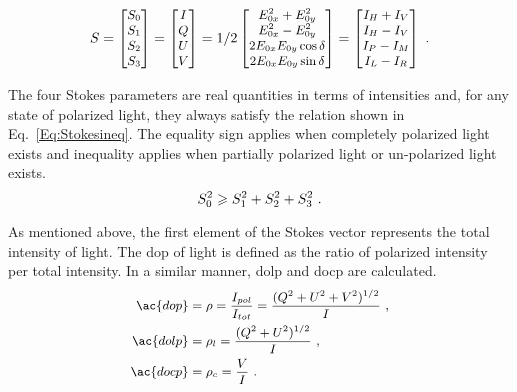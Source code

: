 \begin{equation}\label{Eq:stokevector}
\small
S = 
	\begin{bmatrix}
	S_{0}\\
	S_{1}\\
	S_{2}\\	
	S_{3}\\
	\end{bmatrix} 
	= 
	\begin{bmatrix}
	I\\
	Q\\
	U\\	
	V\\
	\end{bmatrix} 
	= 1/2
	\begin{bmatrix}
	E_{0x}^{2} + E_{0y}^{2} \\
	E_{0x}^{2} - E_{0y}^{2}\\
	2E_{0x}E_{0y}\cos\delta\\	
	2E_{0x}E_{0y}\sin\delta\\
	\end{bmatrix} 
	= 
	\begin{bmatrix}
	I_{H}+ I_{V}\\
	I_{H}- I_{V}\\
	I_{P}- I_{M}\\
	I_{L}- I_{R}\\
	\end{bmatrix}~.	
\end{equation}

The four Stokes parameters are real quantities in terms of intensities and, for any state of polarized light, they always satisfy the relation shown in Eq.~\ref{Eq:Stokesineq}.
The equality sign applies when completely polarized light exists and inequality applies when partially polarized light or un-polarized light exists.
\begin{equation}\label{Eq:Stokesineq}
\small
	S_{0}^{2}\geqslant S_{1}^{2}+ S_{2}^{2}+S_{3}^{2}~.
\end{equation}

As mentioned above, the first element of the Stokes vector represents the total intensity of light.
The \ac{dop} of light is defined as the ratio of polarized intensity per total intensity.
In a similar manner, \ac{dolp} and \ac{docp} are calculated.
\begin{subequations}\label{Eq:DP}
\small
	\begin{align}
	\ac{dop}  & =  \rho =\frac{I_{pol}}{I_{tot}} = \frac{(Q^2 + U^2 + V^2)^{1/2}}{I}~, \\
	\ac{dolp} & = \rho_{l}= \frac{(Q^2 + U^2 )^{1/2}}{I}~, \\
	\ac{docp} & = \rho_{c} = \frac{V}{I}~.
	\end{align}
\end{subequations}

